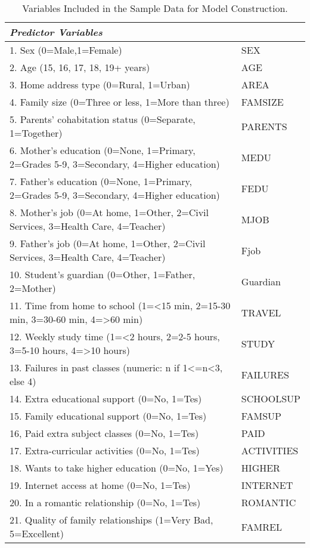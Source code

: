 \documentclass[sigconf]{acmart}
\begin{document}
\begin{table*}[ht]
  \caption{Variables Included in the Sample Data for Model Construction.}
  \label{tab:freq}
  \begin{tabular}{ll}
    \toprule
    \textit{Predictor Variables} &    \\
    \midrule
    1. Sex (0=Male,1=Female) & SEX  \\  
    2. Age (15, 16, 17, 18, 19+ years) & AGE  \\
    3. Home address type (0=Rural, 1=Urban) & AREA  \\
    4. Family size (0=Three or less, 1=More than three) & FAMSIZE  \\
    5. Parents' cohabitation status (0=Separate, 1=Together) & PARENTS  \\ 
    6. Mother's education (0=None, 1=Primary, 2=Grades 5-9,  3=Secondary, 4=Higher education) & MEDU  \\
    7. Father's education (0=None, 1=Primary, 2=Grades 5-9,  3=Secondary, 4=Higher education) & FEDU  \\
    8. Mother's job (0=At home, 1=Other, 2=Civil Services, 3=Health Care, 4=Teacher) & MJOB  \\
    9. Father's job (0=At home, 1=Other, 2=Civil Services, 3=Health Care, 4=Teacher) & Fjob  \\
    10. Student's guardian (0=Other, 1=Father, 2=Mother) & Guardian  \\
    11. Time from home to school (1=<15 min, 2=15-30 min, 3=30-60 min, 4=>60 min) & TRAVEL  \\
    12. Weekly study time (1=<2 hours, 2=2-5 hours, 3=5-10 hours, 4=>10 hours) & STUDY  \\
    13. Failures in past classes (numeric: n if 1<=n<3, else 4) & FAILURES  \\
    14. Extra educational support (0=No, 1=Tes) & SCHOOLSUP  \\
    15. Family educational support (0=No, 1=Tes) & FAMSUP  \\
    16, Paid extra subject classes (0=No, 1=Tes) & PAID  \\
    17. Extra-curricular activities (0=No, 1=Tes) & ACTIVITIES  \\
    18. Wants to take higher education (0=No, 1=Yes) & HIGHER  \\
    19. Internet access at home (0=No, 1=Tes) & INTERNET  \\
    20. In a romantic relationship (0=No, 1=Tes) & ROMANTIC  \\
    21. Quality of family relationships (1=Very Bad, 5=Excellent) & FAMREL  \\

\end{tabular}
\end{table*}
\end{document}
